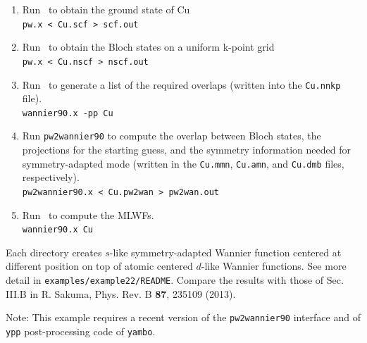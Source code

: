 \documentclass[a4paper,11pt,twoside]{article}
\begin{document}
\begin{enumerate}
\item Run \pwscf\ to obtain the ground state of Cu\\
{\tt pw.x < Cu.scf > scf.out}

\item Run \pwscf\ to obtain the Bloch states on a uniform k-point grid\\
{\tt pw.x < Cu.nscf > nscf.out}

\item Run \wannier\ to generate a list of the required overlaps (written
  into the {\tt Cu.nnkp} file).\\ 
{\tt wannier90.x -pp Cu}

\item Run {\tt pw2wannier90} to compute the overlap between Bloch
  states, the projections for the starting guess, and the symmetry information needed for symmetry-adapted mode (written in the
  {\tt Cu.mmn}, {\tt Cu.amn}, and {\tt Cu.dmb} files, respectively).\\  
{\tt pw2wannier90.x < Cu.pw2wan > pw2wan.out}

\item Run \wannier\ to compute the MLWFs.\\
{\tt wannier90.x Cu}
\end{enumerate}

Each directory creates $s$-like symmetry-adapted Wannier function centered at different position on top of atomic centered $d$-like Wannier functions. 
See more detail in {\tt examples/example22/README}. 
Compare the results with those of Sec. III.B in R. Sakuma,  Phys. Rev. B {\bf 87}, 235109 (2013). 



Note: This example requires a recent version of the {\tt pw2wannier90} interface and of {\tt ypp} post-processing code of {\tt yambo}.
\end{document}
